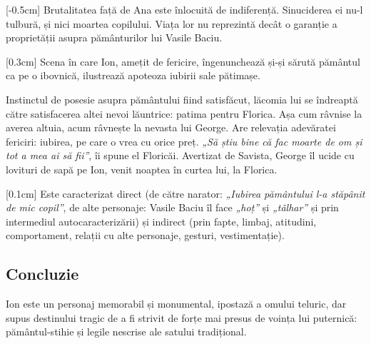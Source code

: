 [-0.5cm]
Brutalitatea față de Ana este înlocuită de indiferență. Sinuciderea ei nu-l tulbură, și nici moartea copilului. Viața lor nu reprezintă decât o garanție a proprietății asupra pământurilor lui Vasile Baciu.

[0.3cm]
Scena în care Ion, amețit de fericire, îngenunchează și-și sărută pământul ca pe o ibovnică, ilustrează apoteoza iubirii sale pătimașe.

Instinctul de posesie asupra pământului fiind satisfăcut, lăcomia lui se îndreaptă către satisfacerea altei nevoi lăuntrice: patima pentru Florica. Așa cum râvnise la averea altuia, acum râvnește la nevasta lui George. Are relevația adevăratei fericiri: iubirea, pe care o vrea cu orice preț. \textit{„Să știu bine că fac moarte de om și tot a mea ai să fii”}, îi spune el Floricăi. Avertizat de Savista, George îl ucide cu lovituri de sapă pe Ion, venit noaptea în curtea lui, la Florica.

[0.1cm]
Este caracterizat direct (de către narator: \textit{„Iubirea pământului l-a stăpânit de mic copil”}, de alte personaje: Vasile Baciu îl face \textit{„hoț”} și \textit{„tâlhar”} și prin intermediul autocaracterizării) și indirect (prin fapte, limbaj, atitudini, comportament, relații cu alte personaje, gesturi, vestimentație).


\subsection{Concluzie}

Ion este un personaj memorabil și monumental, ipostază a omului teluric, dar supus destinului tragic de a fi strivit de forțe mai presus de voința lui puternică: pământul-stihie și legile nescrise ale satului tradițional.
